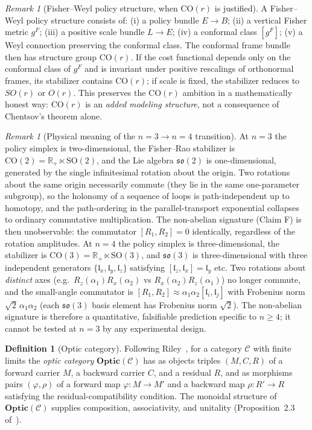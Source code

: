 \documentclass[11pt,a4paper]{article}
\theoremstyle{plain}
\theoremstyle{definition}
\newtheorem{definition}[theorem]{Definition}
\theoremstyle{remark}
\newtheorem{remark}[theorem]{Remark}
\newcommand{\CC}{\mathcal{C}}
\newcommand{\RR}{\mathbb{R}}
\newcommand{\SO}{\mathrm{SO}}
\newcommand{\CO}{\mathrm{CO}}
\newcommand{\so}{\mathfrak{so}}
\newcommand{\Optic}{\mathbf{Optic}}
\begin{document}
\begin{remark}[Fisher--Weyl policy structure, when $\CO(r)$ is justified]
\label{rem:fisher-weyl}
A Fisher--Weyl policy structure consists of: (i) a policy bundle
$E\to B$; (ii) a vertical Fisher metric $g^F$; (iii) a positive scale
bundle $L\to E$; (iv) a conformal class $[g^F]$; (v) a Weyl connection
preserving the conformal class. The conformal frame bundle then has
structure group $\CO(r)$. If the cost functional depends only on the
conformal class of $g^F$ and is invariant under positive rescalings of
orthonormal frames, its stabilizer contains $\CO(r)$; if scale is
fixed, the stabilizer reduces to $SO(r)$ or $O(r)$. This preserves the
$\CO(r)$ ambition in a mathematically honest way: $\CO(r)$ is an
\emph{added modeling structure}, not a consequence of Chentsov's
theorem alone.
\end{remark}

\begin{remark}[Physical meaning of the $n=3\to n=4$ transition]
\label{rem:n3-n4}
At $n=3$ the policy simplex is two-dimensional, the Fisher--Rao
stabilizer is $\CO(2)=\RR_+\ltimes\SO(2)$, and the Lie algebra
$\so(2)$ is one-dimensional, generated by the single infinitesimal
rotation about the origin. Two rotations about the same origin
necessarily commute (they lie in the same one-parameter subgroup), so
the holonomy of a sequence of loops is path-independent up to
homotopy, and the path-ordering in the parallel-transport exponential
collapses to ordinary commutative multiplication. The non-abelian
signature (Claim F) is then unobservable: the commutator
$[R_1,R_2]=0$ identically, regardless of the rotation amplitudes.
At $n=4$ the policy simplex is three-dimensional, the stabilizer is
$\CO(3)=\RR_+\ltimes\SO(3)$, and $\so(3)$ is three-dimensional with
three independent generators $\{\mathfrak{l}_x,\mathfrak{l}_y,
\mathfrak{l}_z\}$ satisfying $[\mathfrak{l}_z,\mathfrak{l}_x]
=\mathfrak{l}_y$ etc. Two rotations about \emph{distinct} axes (e.g.\
$R_z(\alpha_1)R_x(\alpha_2)$ vs $R_x(\alpha_2)R_z(\alpha_1)$) no
longer commute, and the small-angle commutator is
$[R_1,R_2]\approx\alpha_1\alpha_2[\mathfrak{l}_i,\mathfrak{l}_j]$
with Frobenius norm $\sqrt{2}\,\alpha_1\alpha_2$ (each
$\so(3)$ basis element has Frobenius norm $\sqrt{2}$). The
non-abelian signature is therefore a quantitative, falsifiable
prediction specific to $n\geq 4$; it cannot be tested at $n=3$ by any
experimental design.
\end{remark}

\begin{definition}[Optic category]
\label{def:optic}
Following Riley~\cite{riley2018optics}, for a category $\CC$ with finite
limits the \emph{optic category} $\Optic(\CC)$ has as objects triples
$(M, C, R)$ of a forward carrier $M$, a backward carrier $C$, and a
residual $R$, and as morphisms pairs $(\varphi, \rho)$ of a forward map
$\varphi:M\to M'$ and a backward map $\rho:R'\to R$ satisfying the
residual-compatibility condition. The monoidal structure of
$\Optic(\CC)$ supplies composition, associativity, and unitality
(Proposition~2.3 of~\cite{riley2018optics}).
\end{definition}
\end{document}
